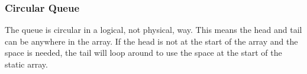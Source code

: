 \subsubsection{Circular Queue}
The queue is circular in a logical, not physical, way. This means the head and tail can be anywhere in the array. If the head is not at the start of the array and the space is needed, the tail will loop around to use the space at the start of the static array.

